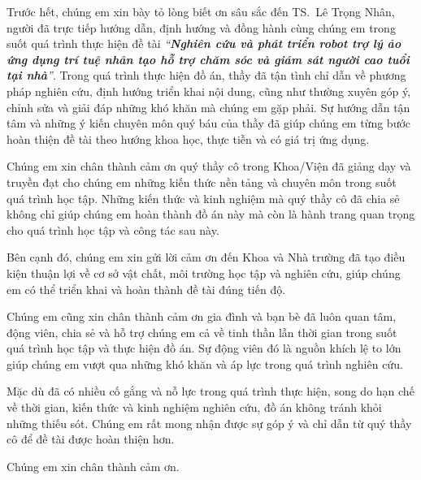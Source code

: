 Trước hết, chúng em xin bày tỏ lòng biết ơn sâu sắc đến TS.~Lê Trọng Nhân, người đã trực tiếp hướng dẫn, định hướng và đồng hành cùng chúng em trong suốt quá trình thực hiện đề tài 
\textit{``\textbf{Nghiên cứu và phát triển robot trợ lý ảo ứng dụng trí tuệ nhân tạo hỗ trợ chăm sóc và giám sát người cao tuổi tại nhà}''}. 
Trong quá trình thực hiện đồ án, thầy đã tận tình chỉ dẫn về phương pháp nghiên cứu, định hướng triển khai nội dung, cũng như thường xuyên góp ý, chỉnh sửa và giải đáp những khó khăn mà chúng em gặp phải. Sự hướng dẫn tận tâm và những ý kiến chuyên môn quý báu của thầy đã giúp chúng em từng bước hoàn thiện đề tài theo hướng khoa học, thực tiễn và có giá trị ứng dụng.

Chúng em xin chân thành cảm ơn quý thầy cô trong Khoa/Viện đã giảng dạy và truyền đạt cho chúng em những kiến thức nền tảng và chuyên môn trong suốt quá trình học tập. Những kiến thức và kinh nghiệm mà quý thầy cô đã chia sẻ không chỉ giúp chúng em hoàn thành đồ án này mà còn là hành trang quan trọng cho quá trình học tập và công tác sau này.

Bên cạnh đó, chúng em xin gửi lời cảm ơn đến Khoa và Nhà trường đã tạo điều kiện thuận lợi về cơ sở vật chất, môi trường học tập và nghiên cứu, giúp chúng em có thể triển khai và hoàn thành đề tài đúng tiến độ.

Chúng em cũng xin chân thành cảm ơn gia đình và bạn bè đã luôn quan tâm, động viên, chia sẻ và hỗ trợ chúng em cả về tinh thần lẫn thời gian trong suốt quá trình học tập và thực hiện đồ án. Sự động viên đó là nguồn khích lệ to lớn giúp chúng em vượt qua những khó khăn và áp lực trong quá trình nghiên cứu.

Mặc dù đã có nhiều cố gắng và nỗ lực trong quá trình thực hiện, song do hạn chế về thời gian, kiến thức và kinh nghiệm nghiên cứu, đồ án không tránh khỏi những thiếu sót. Chúng em rất mong nhận được sự góp ý và chỉ dẫn từ quý thầy cô để đề tài được hoàn thiện hơn.

Chúng em xin chân thành cảm ơn.

\groupsignature

